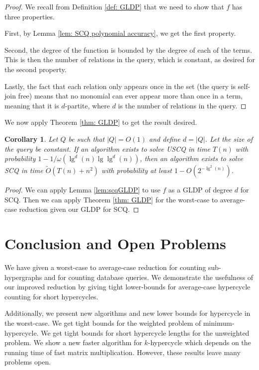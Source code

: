 \documentclass[11pt,letterpaper,pdftex]{article}
\newtheorem{corollary}[theorem]{Corollary}
\def\Otil{\tilde{O}}
\begin{document}
\begin{proof}
We recall from Definition \ref{def: GLDP} that we need to show that $f$ has three properties.

First, by Lemma \ref{lem: SCQ polynomial accuracy}, we get the first property.

Second, the degree of the function is bounded by the degree of each of the terms. This is then the number of relations in the query, which is constant, as desired for the second property.

Lastly, the fact that each relation only appears once in the set (the query is self-join free) means that no monomial can ever appear more than once in a term, meaning that it is $d$-partite, where $d$ is the number of relations in the query.
\end{proof}

We now apply Theorem \ref{thm: GLDP} to get the result desired.

\begin{corollary}\label{cor: SCQ to USCQ}
Let $ Q $ be such that $|Q|= O(1) $ and define $d = |Q|$. Let the size of the query be constant. If an algorithm exists to solve USCQ in time $T(n)$ with probability $1-1/\omega(\lg^d(n)\lg\lg^d(n) )$, then an algorithm exists to solve SCQ in time $\Otil(T(n) + n^2)$ with probability at least $1-O \left(2^ {-\lg^2(n)}\right)$.
\end{corollary}
\begin{proof}
    We can apply Lemma \ref{lem:scqGLDP} to use $f$ as a GLDP of degree $d$ for SCQ. Then we can apply Theorem \ref{thm: GLDP} for the worst-case to average-case reduction given our GLDP for SCQ.
\end{proof}
 
\section{Conclusion and Open Problems}
\label{sec:conc_and_open_prob}
We have given a worst-case to average-case reduction for counting sub-hypergraphs and for counting database queries. We demonstrate the usefulness of our improved reduction by giving tight lower-bounds for average-case hypercycle counting for short hypercycles. 

Additionally, we present new algorithms and new lower bounds for hypercycle in the worst-case. We get tight bounds for the weighted problem of minimum-hypercycle. We get tight bounds for short hypercycle lengths for the unweighted problem. We show a new faster algorithm for $k$-hypercycle which depends on the running time of fast matrix multiplication. However, these results leave many problems open. 
\end{document}
